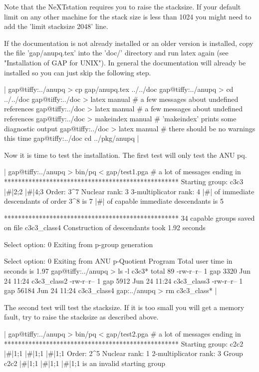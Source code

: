 Note that the  NeXTstation requires you to raise the stacksize.   If your
default limit on any other machine for the stack size  is less than  1024
you might need to add the 'limit stacksize 2048' line.
     
If the documentation is  not  already installed  or an older  version  is
installed, copy  the file 'gap/anupq.tex' into  the  'doc/' directory and
run latex  again (see "Installation  of  GAP for  UNIX").  In general the
documentation will   already  be installed  so  you   can  just skip  the
following step.

|    gap@tiffy:../anupq > cp gap/anupq.tex ../../doc
    gap@tiffy:../anupq > cd ../../doc
    gap@tiffy:../doc > latex manual
    # a few messages about undefined references
    gap@tiffy:../doc > latex manual
    # a few messages about undefined references
    gap@tiffy:../doc > makeindex manual
    # 'makeindex' prints some diagnostic output
    gap@tiffy:../doc > latex manual
    # there should be no warnings this time
    gap@tiffy:../doc cd ../pkg/anupq |

Now it is time to test  the installation.  The  first test will only test
the ANU pq.

|    gap@tiffy:../anupq > bin/pq < gap/test1.pga
    # a lot of messages ending in
    **************************************************
    Starting group: c3c3 |\#|2;2 |\#|4;3
    Order: 3^7
    Nuclear rank: 3
    3-multiplicator rank: 4
    |\#| of immediate descendants of order 3^8 is 7
    |\#| of capable immediate descendants is 5

    **************************************************
    34 capable groups saved on file c3c3_class4
    Construction of descendants took 1.92 seconds

    Select option: 0 
    Exiting from p-group generation

    Select option: 0 
    Exiting from ANU p-Quotient Program
    Total user time in seconds is 1.97
    gap@tiffy:../anupq > ls -l c3c3*
    total 89
    -rw-r--r--    1 gap    3320 Jun 24 11:24 c3c3_class2
    -rw-r--r--    1 gap    5912 Jun 24 11:24 c3c3_class3
    -rw-r--r--    1 gap   56184 Jun 24 11:24 c3c3_class4
    gap:../anupq > rm c3c3_class* |

The second test will test the stacksize. If it is too small you will  get
a memory fault, try to raise the stacksize as described above.

|    gap@tiffy:../anupq > bin/pq < gap/test2.pga
    # a lot of messages ending in
    **************************************************
    Starting group: c2c2 |\#|1;1 |\#|1;1 |\#|1;1
    Order: 2^5
    Nuclear rank: 1
    2-multiplicator rank: 3
    Group c2c2 |\#|1;1 |\#|1;1 |\#|1;1 is an invalid starting group

